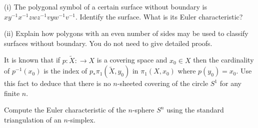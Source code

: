 \documentclass[12pt]{exam}
\theoremstyle{definition}
\begin{document}
\begin{questions}










\question

(i) The polygonal symbol of a certain surface without boundary is
$xy^{-1}x^{-1}zwz^{-1}vyw^{-1}v^{-1}$. Identify the surface. What is
its Euler characteristic?

(ii) Explain how polygons with an even number of sides may be used
to classify surfaces without boundary. You do not need to give
detailed proofs.

\question

It is known that if $p: \tilde{X}: \rightarrow X$ is a covering
space and $x_0 \in X$ then the cardinality of $p^{-1}(x_0)$ is the
index of $p_{*}\pi_1( \tilde{X},y_0)$ in $\pi_1(X,x_0)$ where
$p(y_0)=x_0$. Use this fact to deduce that there is no $n$-sheeted
covering of the circle $S^1$ for any finite $n$.

\question

Compute the Euler characteristic of the $n$-sphere $S^n$ using the
standard triangulation of an $n$-simplex.



\end{questions}
\end{document}
